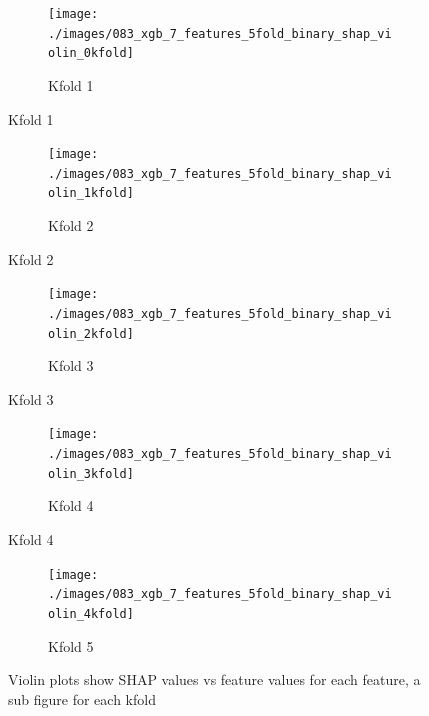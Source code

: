 \begin{figure}[!ht]
\end{figure}



\begin{figure}[!h]
    \centering
    \begin{subfigure}[b]{1\textwidth}
      \centering
      \texttt{[image: ./images/083\_xgb\_7\_features\_5fold\_binary\_shap\_violin\_0kfold]}\\
      \caption{Kfold 1}
      \label{fig:results_waterfall}
    \end{subfigure}
\end{figure}
\begin{figure}[!h]\ContinuedFloat
    \begin{subfigure}[b]{1\textwidth}
      \centering    
      \texttt{[image: ./images/083\_xgb\_7\_features\_5fold\_binary\_shap\_violin\_1kfold]}\\
      \caption{Kfold 2}
      \label{fig:results_waterfall}
    \end{subfigure}
\end{figure}
\begin{figure}[!h]\ContinuedFloat
    \begin{subfigure}[b]{1\textwidth}
      \centering
      \texttt{[image: ./images/083\_xgb\_7\_features\_5fold\_binary\_shap\_violin\_2kfold]}\\
      \caption{Kfold 3}
      \label{fig:results_waterfall}
    \end{subfigure}
\end{figure}
\begin{figure}[!h]\ContinuedFloat
    \begin{subfigure}[b]{1\textwidth}
      \centering
      \texttt{[image: ./images/083\_xgb\_7\_features\_5fold\_binary\_shap\_violin\_3kfold]}\\
      \caption{Kfold 4}
      \label{fig:results_waterfall}
    \end{subfigure}
\end{figure}
\begin{figure}[!h]\ContinuedFloat
    \begin{subfigure}[b]{1\textwidth}
      \centering
      \texttt{[image: ./images/083\_xgb\_7\_features\_5fold\_binary\_shap\_violin\_4kfold]}\\
      \caption{Kfold 5}
      \label{fig:results_waterfall}
    \end{subfigure}
  \caption{Violin plots show SHAP values vs feature values for each feature, a sub figure for each kfold}
\end{figure}



